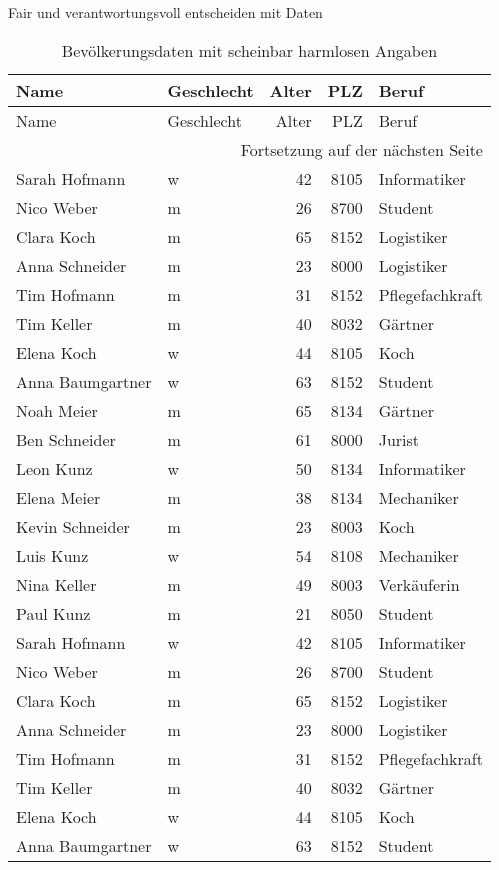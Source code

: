 \begin{lpu}{Fair und verantwortungsvoll entscheiden mit Daten}
\begin{longtable}{llrrl}
\caption{Bevölkerungsdaten mit scheinbar harmlosen Angaben}
\label{tab:bevoelkerung} \\
\toprule
Name & Geschlecht & Alter & PLZ & Beruf \\
\midrule
\endfirsthead
\toprule
Name & Geschlecht & Alter & PLZ & Beruf \\
\midrule
\endhead
\midrule
\multicolumn{5}{r}{{Fortsetzung auf der nächsten Seite}} \\
\midrule
\endfoot
\bottomrule
\endlastfoot
Sarah Hofmann     & w & 42 & 8105 & Informatiker \\
Nico Weber        & m & 26 & 8700 & Student \\
Clara Koch        & m & 65 & 8152 & Logistiker \\
Anna Schneider    & m & 23 & 8000 & Logistiker \\
Tim Hofmann       & m & 31 & 8152 & Pflegefachkraft \\
Tim Keller        & m & 40 & 8032 & Gärtner \\
Elena Koch        & w & 44 & 8105 & Koch \\
Anna Baumgartner  & w & 63 & 8152 & Student \\
Noah Meier        & m & 65 & 8134 & Gärtner \\
Ben Schneider     & m & 61 & 8000 & Jurist \\
Leon Kunz         & w & 50 & 8134 & Informatiker \\
Elena Meier       & m & 38 & 8134 & Mechaniker \\
Kevin Schneider   & m & 23 & 8003 & Koch \\
Luis Kunz         & w & 54 & 8108 & Mechaniker \\
Nina Keller       & m & 49 & 8003 & Verkäuferin \\
Paul Kunz         & m & 21 & 8050 & Student \\
Sarah Hofmann & w & 42 & 8105 & Informatiker \\
Nico Weber & m & 26 & 8700 & Student \\
Clara Koch & m & 65 & 8152 & Logistiker \\
Anna Schneider & m & 23 & 8000 & Logistiker \\
Tim Hofmann & m & 31 & 8152 & Pflegefachkraft \\
Tim Keller & m & 40 & 8032 & Gärtner \\
Elena Koch & w & 44 & 8105 & Koch \\
Anna Baumgartner & w & 63 & 8152 & Student \\

\end{longtable}
\end{lpu}
